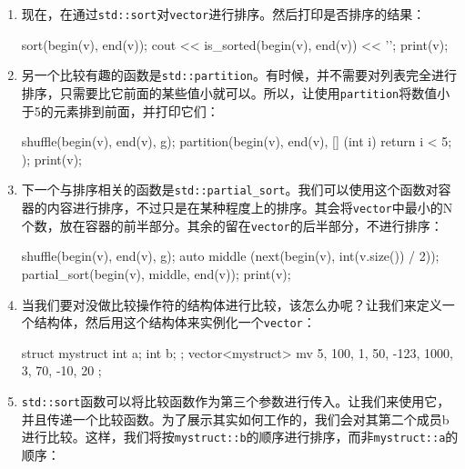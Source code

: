 \begin{enumerate}
\begin{codebox}[cpp]
    cout << is_sorted(begin(v), end(v)) << '\n';
    print(v);
\end{codebox}

\item 现在，在通过\texttt{std::sort}对\texttt{vector}进行排序。然后打印是否排序的结果：

\begin{codebox}[cpp]
    sort(begin(v), end(v));
    cout << is_sorted(begin(v), end(v)) << '\n';
    print(v);
\end{codebox}

\item 另一个比较有趣的函数是\texttt{std::partition}。有时候，并不需要对列表完全进行排序，只需要比它前面的某些值小就可以。所以，让使用\texttt{partition}将数值小于5的元素排到前面，并打印它们：

\begin{codebox}[cpp]
    shuffle(begin(v), end(v), g);
    partition(begin(v), end(v), [] (int i) { return i < 5; });
    print(v); 
\end{codebox}

\item 下一个与排序相关的函数是\texttt{std::partial\_sort}。我们可以使用这个函数对容器的内容进行排序，不过只是在某种程度上的排序。其会将\texttt{vector}中最小的N个数，放在容器的前半部分。其余的留在\texttt{vector}的后半部分，不进行排序：

\begin{codebox}[cpp]
    shuffle(begin(v), end(v), g);
    auto middle (next(begin(v), int(v.size()) / 2));
    partial_sort(begin(v), middle, end(v));
    print(v);
\end{codebox}

\item 当我们要对没做比较操作符的结构体进行比较，该怎么办呢？让我们来定义一个结构体，然后用这个结构体来实例化一个\texttt{vector}：

\begin{codebox}[cpp]
struct mystruct {
int a;
int b;
};
vector<mystruct> mv { {5, 100}, {1, 50}, {-123, 1000},
                   {3, 70}, {-10, 20} };
\end{codebox}

\item \texttt{std::sort}函数可以将比较函数作为第三个参数进行传入。让我们来使用它，并且传递一个比较函数。为了展示其实如何工作的，我们会对其第二个成员b进行比较。这样，我们将按\texttt{mystruct::b}的顺序进行排序，而非\texttt{mystruct::a}的顺序：


\end{enumerate}
